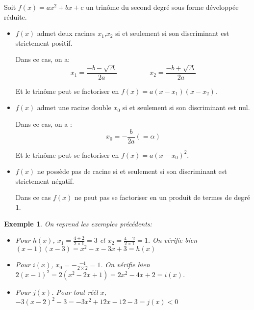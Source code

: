 \documentclass[a4paper,11pt]{article}
\theoremstyle{break}
\newtheorem{exemple}{Exemple}
\begin{document}
  \begin{theorem}[Central]
    Soit $f(x)=ax^2+bx+c$ un trinôme du second degré sous forme développée réduite.
    \begin{itemize}
     \item  $f(x)$ admet deux racines $x_1$,$x_2$ si et seulement si 
     son discriminant est strictement positif.
     
     Dans ce cas, on a:
     $$x_1=\frac{-b-\sqrt{\Delta}}{2a} \hspace{2cm} x_2=\frac{-b+\sqrt{\Delta}}{2a}$$
     
     Et le trinôme peut se factoriser en $f(x)=a(x-x_1)(x-x_2)$.
     
     \item $f(x)$ admet une racine double $x_0$ si et seulement si
     son discriminant est nul.
     
     Dans ce cas, on a :
     $$x_0=-\frac{b}{2a}(=\alpha)$$
     
     Et le trinôme peut se factoriser en $f(x)=a(x-x_0)^2$.
     
     \item $f(x)$ ne possède pas de racine si et seulement si son discriminant
     est strictement négatif.
     
     Dans ce cas $f(x)$ ne peut pas se factoriser en un produit de termes de degré 1.
    \end{itemize}    
  \end{theorem}
  
  \begin{exemple}
    On reprend les exemples précédents:
    \begin{itemize}
     \item Pour $h(x)$, $x_1=\frac{4+2}{2 \times 1}=3$ et $x_2=\frac{4-2}{2 \times 1}=1$.
    On vérifie bien $(x-1)(x-3)=x^2-x-3x+3=h(x)$ 
      
    \item Pour $i(x)$, $x_0=-\frac{-4}{2 \times 2}=1$. On vérifie bien
    $2(x-1)^2=2(x^2-2x+1)=2x^2-4x+2=i(x)$.
     \item Pour $j(x)$. Pour tout réél $x$, $-3(x-2)^2-3=-3x^2+12x-12-3=j(x)<0$
    \end{itemize}
   \end{exemple}
   
\end{document}
